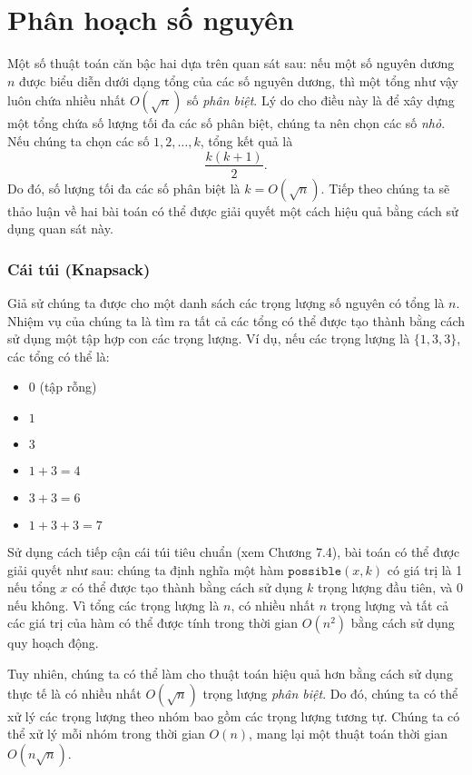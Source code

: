 \section{Phân hoạch số nguyên}

Một số thuật toán căn bậc hai dựa trên
quan sát sau:
nếu một số nguyên dương $n$ được biểu diễn dưới dạng
tổng của các số nguyên dương,
thì một tổng như vậy luôn chứa nhiều nhất
$O(\sqrt n)$ số \emph{phân biệt}.
Lý do cho điều này là để xây dựng
một tổng chứa số lượng tối đa các số phân biệt,
chúng ta nên chọn các số \emph{nhỏ}.
Nếu chúng ta chọn các số $1,2,\ldots,k$,
tổng kết quả là
\[\frac{k(k+1)}{2}.\]
Do đó, số lượng tối đa các số phân biệt là $k = O(\sqrt n)$.
Tiếp theo chúng ta sẽ thảo luận về hai bài toán có thể được giải quyết
một cách hiệu quả bằng cách sử dụng quan sát này.

\subsubsection{Cái túi (Knapsack)}

Giả sử chúng ta được cho một danh sách các trọng lượng số nguyên
có tổng là $n$.
Nhiệm vụ của chúng ta là tìm ra tất cả các tổng có thể được tạo thành bằng cách sử dụng
một tập hợp con các trọng lượng. Ví dụ, nếu các trọng lượng là
$\{1,3,3\}$, các tổng có thể là:

\begin{itemize}[noitemsep]
\item $0$ (tập rỗng)
\item $1$
\item $3$
\item $1+3=4$
\item $3+3=6$
\item $1+3+3=7$
\end{itemize}

Sử dụng cách tiếp cận cái túi tiêu chuẩn (xem Chương 7.4),
bài toán có thể được giải quyết như sau:
chúng ta định nghĩa một hàm $\texttt{possible}(x,k)$ có giá trị là 1
nếu tổng $x$ có thể được tạo thành bằng cách sử dụng $k$ trọng lượng đầu tiên,
và 0 nếu không.
Vì tổng các trọng lượng là $n$,
có nhiều nhất $n$ trọng lượng và
tất cả các giá trị của hàm có thể được tính
trong thời gian $O(n^2)$ bằng cách sử dụng quy hoạch động.

Tuy nhiên, chúng ta có thể làm cho thuật toán hiệu quả hơn
bằng cách sử dụng thực tế là có nhiều nhất $O(\sqrt n)$
trọng lượng \emph{phân biệt}.
Do đó, chúng ta có thể xử lý các trọng lượng theo nhóm
bao gồm các trọng lượng tương tự.
Chúng ta có thể xử lý mỗi nhóm
trong thời gian $O(n)$, mang lại một thuật toán thời gian $O(n \sqrt n)$.


